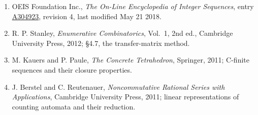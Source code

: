 \documentclass[11pt]{article}
\theoremstyle{definition}
\begin{document}
\begin{enumerate}

\item OEIS Foundation Inc., \emph{The On-Line Encyclopedia of Integer Sequences}, entry \href{https://oeis.org/A304923}{A304923}, revision 4, last modified May 21 2018.

\item R. P. Stanley, \emph{Enumerative Combinatorics}, Vol.~1, 2nd ed., Cambridge University Press, 2012; \S4.7, the transfer-matrix method.

\item M. Kauers and P. Paule, \emph{The Concrete Tetrahedron}, Springer, 2011; C-finite sequences and their closure properties.

\item J. Berstel and C. Reutenauer, \emph{Noncommutative Rational Series with Applications}, Cambridge University Press, 2011; linear representations of counting automata and their reduction.

\end{enumerate}
\end{document}
